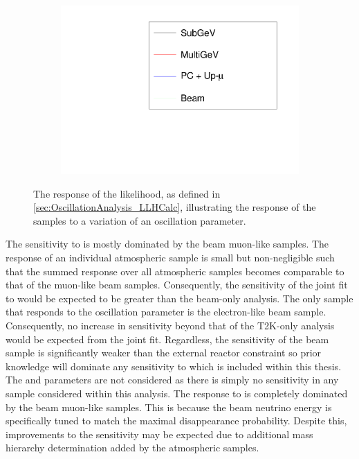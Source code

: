 \begin{figure}[h]
\begin{subfigure}[t]{0.5\textwidth}
    \includegraphics[width=\textwidth, trim={0mm 0mm 0mm 0mm}, clip,page=3]{Figures/OA/LLHScans_Osc.pdf}
  \end{subfigure}
  \caption{The response of the likelihood, as defined in \autoref{sec:OscillationAnalysis_LLHCalc}, illustrating the response of the samples to a variation of an oscillation parameter.}
  \label{fig:OscillationAnalysis_LLHScanOscPars}
\end{figure}

The sensitivity to  is mostly dominated by the beam muon-like samples. The response of an individual atmospheric sample is small but non-negligible such that the summed response over all atmospheric samples becomes comparable to that of the muon-like beam samples. Consequently, the sensitivity of the joint fit to  would be expected to be greater than the beam-only analysis. The only sample that responds to the  oscillation parameter is the electron-like beam sample. Consequently, no increase in sensitivity beyond that of the T2K-only analysis would be expected from the joint fit. Regardless, the sensitivity of the beam sample is significantly weaker than the external reactor constraint so prior knowledge will dominate any sensitivity to  which is included within this thesis. The  and  parameters are not considered as there is simply no sensitivity in any sample considered within this analysis. The response to  is completely dominated by the beam muon-like samples. This is because the beam neutrino energy is specifically tuned to match the maximal disappearance probability. Despite this, improvements to the  sensitivity may be expected due to additional mass hierarchy determination added by the atmospheric samples.


